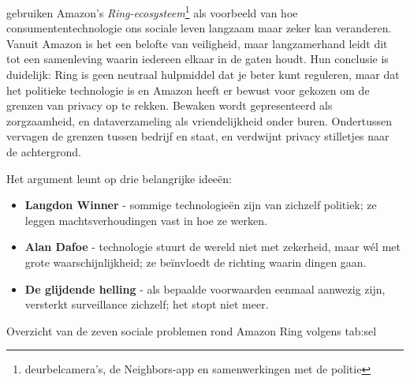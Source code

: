 \documentclass[nonacm, sigconf]{acmart}
\begin{document}
    \parencite{selinger2022amazon} gebruiken Amazon's \textit{Ring-ecosysteem}\footnote{deurbelcamera's, de Neighbors-app en samenwerkingen met de politie} als voorbeeld van hoe consumententechnologie ons sociale leven langzaam maar zeker kan veranderen.
    Vanuit Amazon is het een belofte van veiligheid, maar langzamerhand leidt dit tot een samenleving waarin iedereen elkaar in de gaten houdt.
    Hun conclusie is duidelijk: Ring is geen neutraal hulpmiddel dat je beter kunt reguleren, maar dat het politieke technologie is en Amazon heeft er bewust voor gekozen om de grenzen van privacy op te rekken.
    Bewaken wordt gepresenteerd als zorgzaamheid, en dataverzameling als vriendelijkheid onder buren.
    Ondertussen vervagen de grenzen tussen bedrijf en staat, en verdwijnt privacy stilletjes naar de achtergrond.

    \vertspace

    \noindent Het argument leunt op drie belangrijke ideeën:
    \begin{itemize}
        \item \textbf{Langdon Winner} - sommige technologieën zijn van zichzelf politiek; ze leggen machtsverhoudingen vast in hoe ze werken.
        \item \textbf{Alan Dafoe} - technologie stuurt de wereld niet met zekerheid, maar wél met grote waarschijnlijkheid; ze beïnvloedt de richting waarin dingen gaan.
        \item \textbf{De glijdende helling} - als bepaalde voorwaarden eenmaal aanwezig zijn, versterkt surveillance zichzelf; het stopt niet meer.
    \end{itemize}

    \vertspace

    \begin{SimpleTable}[s{0.3}s{1.2}]{Overzicht van de zeven sociale problemen rond Amazon Ring volgens \citeauthor{selinger2022amazon}}{tab:sel}
    \end{SimpleTable}
\end{document}
